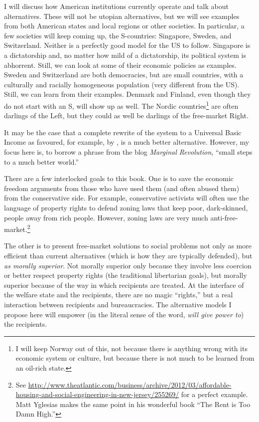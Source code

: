 I will discuss how American institutions currently operate and talk about
alternatives. These will not be utopian alternatives, but we will see examples
from both American states and local regions or other societies. In particular,
a few societies will keep coming up, the S-countries: Singapore, Sweden, and
Switzerland. Neither is a perfectly good model for the US to follow. Singapore
is a dictatorship and, no matter how mild of a dictatorship, its political
system is abhorrent. Still, we can look at some of their economic policies as
examples. Sweden and Switzerland are both democracies, but are small countries,
with a culturally and racially homogeneous population (very different from the
US). Still, we can learn from their examples. Denmark and Finland, even though
they do not start with an S, will show up as well. The Nordic
countries\footnote{I will keep Norway out of this, not because there is
anything wrong with its economic system or culture, but because there is not
much to be learned from an oil-rich state.} are often darlings of the Left, but
they could as well be darlings of the free-market Right.

It may be the case that a complete rewrite of the system to a Universal Basic
Income as favoured, for example, by \citet{Murray_IOH}, is a much better
alternative. However, my focus here is, to borrow a phrase from the blog
\emph{Marginal Revolution}, ``small steps to a much better world.''

\bigskip
\bigskip

There are a few interlocked goals to this book. One is to save the economic
freedom arguments from those who have used them (and often abused them) from
the conservative side. For example, conservative activists will often use the
language of property rights to defend zoning laws that keep poor, dark-skinned,
people away from rich people. However, zoning laws are very much
anti-free-market.\footnote{See
\url{http://www.theatlantic.com/business/archive/2012/03/affordable-housing-and-social-engineering-in-new-jersey/255269/}
for a perfect example. Matt Yglesias makes the same point in his wonderful book
``The Rent is Too Damn High.''} %

The other is to present free-market solutions to social problems not only as
more efficient than current alternatives (which is how they are typically
defended), but \emph{as morally superior}. Not morally superior only because
they involve less coercion or better respect property rights (the
traditional libertarian goals), but morally superior because of the way in
which recipients are treated. At the interface of the welfare state and the
recipients, there are no magic ``rights,'' but a real interaction between
recipients and bureaucracies. The alternative models I propose here will empower
(in the literal sense of the word, \emph{will give power to}) the recipients.

